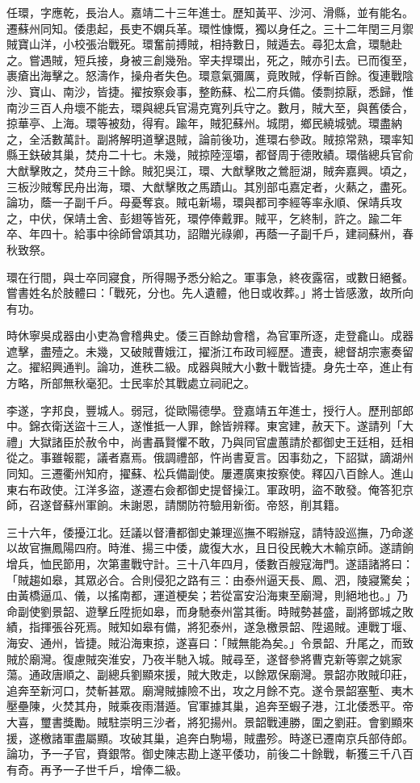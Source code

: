 \begin{pinyinscope}
任環，字應乾，長治人。嘉靖二十三年進士。歷知黃平、沙河、滑縣，並有能名。遷蘇州同知。倭患起，長吏不嫻兵革。環性慷慨，獨以身任之。三十二年閏三月禦賊寶山洋，小校張治戰死。環奮前搏賊，相持數日，賊遁去。尋犯太倉，環馳赴之。嘗遇賊，短兵接，身被三創幾殆。宰夫捍環出，死之，賊亦引去。已而復至，裹瘡出海擊之。怒濤作，操舟者失色。環意氣彌厲，竟敗賊，俘斬百餘。復連戰陰沙、寶山、南沙，皆捷。擢按察僉事，整飭蘇、松二府兵備。倭剽掠厭，悉歸，惟南沙三百人舟壞不能去，環與總兵官湯克寬列兵守之。數月，賊大至，與舊倭合，掠華亭、上海。環等被劾，得宥。踰年，賊犯蘇州。城閉，鄉民繞城號。環盡納之，全活數萬計。副將解明道擊退賊，論前後功，進環右參政。賊掠常熟，環率知縣王鈇破其巢，焚舟二十七。未幾，賊掠陸涇壩，都督周于德敗績。環偕總兵官俞大猷擊敗之，焚舟三十餘。賊犯吳江，環、大猷擊敗之鶯脰湖，賊奔嘉興。頃之，三板沙賊奪民舟出海，環、大猷擊敗之馬蹟山。其別部屯嘉定者，火爇之，盡死。論功，蔭一子副千戶。母憂奪哀。賊屯新場，環與都司李經等率永順、保靖兵攻之，中伏，保靖土舍、彭翅等皆死，環停俸戴罪。賊平，乞終制，許之。踰二年卒、年四十。給事中徐師曾頌其功，詔贈光祿卿，再蔭一子副千戶，建祠蘇州，春秋致祭。

環在行間，與士卒同寢食，所得賜予悉分給之。軍事急，終夜露宿，或數日絕餐。嘗書姓名於肢體曰：「戰死，分也。先人遺體，他日或收葬。」將士皆感激，故所向有功。

時休寧吳成器由小吏為會稽典史。倭三百餘劫會稽，為官軍所逐，走登龕山。成器遮擊，盡殪之。未幾，又破賊曹娥江，擢浙江布政司經歷。遭喪，總督胡宗憲奏留之。擢紹興通判。論功，進秩二級。成器與賊大小數十戰皆捷。身先士卒，進止有方略，所部無秋毫犯。士民率於其戰處立祠祀之。

李遂，字邦良，豐城人。弱冠，從歐陽德學。登嘉靖五年進士，授行人。歷刑部郎中。錦衣衛送盜十三人，遂惟抵一人罪，餘皆辨釋。東宮建，赦天下。遂請列「大禮」大獄諸臣於赦令中，尚書聶賢懼不敢，乃與同官盧蕙請於都御史王廷相，廷相從之。事雖報罷，議者嘉焉。俄調禮部，忤尚書夏言。因事劾之，下詔獄，謫湖州同知。三遷衢州知府，擢蘇、松兵備副使。屢遷廣東按察使。釋囚八百餘人。進山東右布政使。江洋多盜，遂遷右僉都御史提督操江。軍政明，盜不敢發。俺答犯京師，召遂督蘇州軍餉。未謝恩，請關防符驗用新銜。帝怒，削其籍。

三十六年，倭擾江北。廷議以督漕都御史兼理巡撫不暇辦寇，請特設巡撫，乃命遂以故官撫鳳陽四府。時淮、揚三中倭，歲復大水，且日役民輓大木輸京師。遂請餉增兵，恤民節用，次第畫戰守計。三十八年四月，倭數百艘寇海門。遂語諸將曰：「賊趨如皋，其眾必合。合則侵犯之路有三：由泰州逼天長、鳳、泗，陵寢驚矣；由黃橋逼瓜、儀，以搖南都，運道梗矣；若從富安沿海東至廟灣，則絕地也。」乃命副使劉景韶、遊擊丘陞扼如皋，而身馳泰州當其衝。時賊勢甚盛，副將鄧城之敗績，指揮張谷死焉。賊知如皋有備，將犯泰州，遂急檄景韶、陞遏賊。連戰丁堰、海安、通州，皆捷。賊沿海東掠，遂喜曰：「賊無能為矣。」令景韶、升尾之，而致賊於廟灣。復慮賊突淮安，乃夜半馳入城。賊尋至，遂督參將曹克新等禦之姚家蕩。通政唐順之、副總兵劉顯來援，賊大敗走，以餘眾保廟灣。景韶亦敗賊印莊，追奔至新河口，焚斬甚眾。廟灣賊據險不出，攻之月餘不克。遂令景韶塞塹、夷木壓壘陳，火焚其舟，賊乘夜雨潛遁。官軍據其巢，追奔至蝦子港，江北倭悉平。帝大喜，璽書獎勵。賊駐崇明三沙者，將犯揚州。景韶戰連勝，圍之劉莊。會劉顯來援，遂檄諸軍盡屬顯。攻破其巢，追奔白駒場，賊盡殄。時遂已遷南京兵部侍郎。論功，予一子官，賚銀幣。御史陳志勘上遂平倭功，前後二十餘戰，斬獲三千八百有奇。再予一子世千戶，增俸二級。


\end{pinyinscope}
